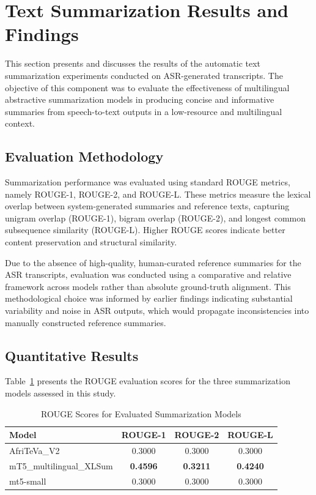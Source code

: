 \section{Text Summarization Results and Findings}

This section presents and discusses the results of the automatic text summarization experiments conducted on ASR-generated transcripts. The objective of this component was to evaluate the effectiveness of multilingual abstractive summarization models in producing concise and informative summaries from speech-to-text outputs in a low-resource and multilingual context.

\subsection{Evaluation Methodology}

Summarization performance was evaluated using standard ROUGE metrics, namely ROUGE-1, ROUGE-2, and ROUGE-L. These metrics measure the lexical overlap between system-generated summaries and reference texts, capturing unigram overlap (ROUGE-1), bigram overlap (ROUGE-2), and longest common subsequence similarity (ROUGE-L). Higher ROUGE scores indicate better content preservation and structural similarity.

Due to the absence of high-quality, human-curated reference summaries for the ASR transcripts, evaluation was conducted using a comparative and relative framework across models rather than absolute ground-truth alignment. This methodological choice was informed by earlier findings indicating substantial variability and noise in ASR outputs, which would propagate inconsistencies into manually constructed reference summaries.

\subsection{Quantitative Results}

Table~\ref{tab:summarization_results} presents the ROUGE evaluation scores for the three summarization models assessed in this study.

\begin{table}[H]
\centering
\caption{ROUGE Scores for Evaluated Summarization Models}
\label{tab:summarization_results}
\begin{tabular}{lccc}
\hline
\textbf{Model} & \textbf{ROUGE-1} & \textbf{ROUGE-2} & \textbf{ROUGE-L} \\
\hline
AfriTeVa\_V2 & 0.3000 & 0.3000 & 0.3000 \\
mT5\_multilingual\_XLSum & \textbf{0.4596} & \textbf{0.3211} & \textbf{0.4240} \\
mt5-small & 0.3000 & 0.3000 & 0.3000 \\
\hline
\end{tabular}
\end{table}

